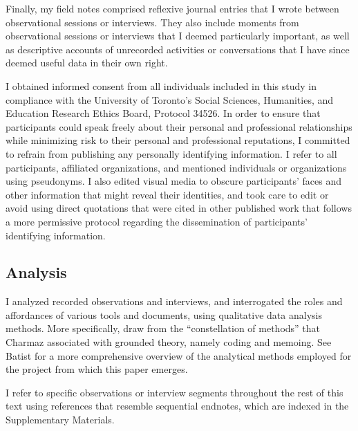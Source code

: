 Finally, my field notes comprised reflexive journal entries that I wrote between observational sessions or interviews.
They also include moments from observational sessions or interviews that I deemed particularly important, as well as descriptive accounts of unrecorded activities or conversations that I have since deemed useful data in their own right.

I obtained informed consent from all individuals included in this study in compliance with the University of Toronto's Social Sciences, Humanities, and Education Research Ethics Board, Protocol 34526.
In order to ensure that participants could speak freely about their personal and professional relationships while minimizing risk to their personal and professional reputations, I committed to refrain from publishing any personally identifying information.
I refer to all participants, affiliated organizations, and mentioned individuals or organizations using pseudonyms.
I also edited visual media to obscure participants' faces and other information that might reveal their identities, and took care to edit or avoid using direct quotations that were cited in other published work that follows a more permissive protocol regarding the dissemination of participants' identifying information.

\subsection*{Analysis}
I analyzed recorded observations and interviews, and interrogated the roles and affordances of various tools and documents, using qualitative data analysis methods.
More specifically, draw from the ``constellation of methods'' that Charmaz \parencite*[14-15]{charmaz2014} associated with grounded theory, namely coding and memoing.
See Batist \parencite*[9-10]{batist2024a} for a more comprehensive overview of the analytical methods employed for the project from which this paper emerges.

I refer to specific observations or interview segments throughout the rest of this text using references that resemble sequential endnotes, which are indexed in the Supplementary Materials.


